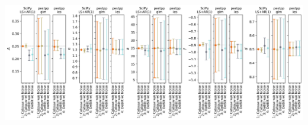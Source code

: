 \documentclass[17pt, a0paper, margin=0mm, innermargin=5mm, blockverticalspace=5mm, colspace=5mm, subcolspace=-15mm]{tikzposter}
\begin{document}
\begin{columns}
{{\begin{minipage}{0.52\linewidth}
\begin{tikzfigure}
    \includegraphics[width=13.0in, height=5.0in]{fig/parameter_estimations_pastas.png}
    \end{tikzfigure}
\end{minipage}
}

}
\end{columns}
\end{document}
